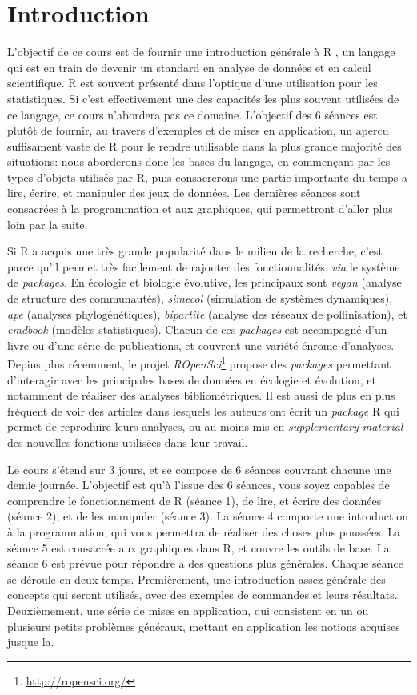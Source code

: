 \chapter{Introduction}

L'objectif de ce cours est de fournir une introduction générale à R \parencite{R-Development-Core-Team2008}, un langage qui est en train de devenir un standard en analyse de données et en calcul scientifique.
R est souvent présenté dans l'optique d'une utilisation pour les statistiques.
Si c'est effectivement une des capacités les plus souvent utilisées de ce langage, ce cours n'abordera pas ce domaine.
L'objectif des 6 séances est plutôt de fournir, au travers d'exemples et de mises en application, un apercu suffisament vaste de R pour le rendre utilisable dans la plus grande majorité des situations:
nous aborderons donc les bases du langage, en commençant par les types d'objets utilisés par R, puis consacrerons une partie importante du temps a lire, écrire, et manipuler des jeux de données.
Les dernières séances sont consacrées à la programmation et aux graphiques, qui permettront d'aller plus loin par la suite.

Si R a acquis une très grande popularité dans le milieu de la recherche, c'est parce qu'il permet très facilement de rajouter des fonctionnalités. \emph{via} le système de \emph{packages}.
En écologie et biologie évolutive, les principaux sont \emph{vegan} (analyse de structure des communautés), \emph{simecol} (simulation de systèmes dynamiques), \emph{ape} (analyses phylogénétiques), \emph{bipartite} (analyse des réseaux de pollinisation), et \emph{emdbook} (modèles statistiques).
Chacun de ces \emph{packages} est accompagné d'un livre ou d'une série de publications, et couvrent une variété énrome d'analyses.
Depius plus récemment, le projet \emph{ROpenSci}\footnote{\url{http://ropensci.org/}} propose des \emph{packages} permettant d'interagir avec les principales bases de données en écologie et évolution, et notamment de réaliser des analyses bibliométriques.
Il est aussi de plus en plus fréquent de voir des articles dans lesquels les auteurs ont écrit un \emph{package} R qui permet de reproduire leurs analyses, ou au moins mis en \emph{supplementary material} des nouvelles fonctions utilisées dans leur travail.  

Le cours s'étend sur 3 jours, et se compose de 6 séances couvrant chacune une demie journée.
L'objectif est qu'à l'issue des 6 séances, vous soyez capables de comprendre le fonctionnement de R (séance 1), de lire, et écrire des données (séance 2), et de les manipuler (séance 3).
La séance 4 comporte une introduction à la programmation, qui vous permettra de réaliser des choses plus poussées.
La séance 5 est consacrée aux graphiques dans R, et couvre les outils de base.
La séance 6 est prévue pour répondre a des questions plus générales.
Chaque séance se déroule en deux temps.
Premièrement, une introduction assez générale des concepts qui seront utilisés, avec des exemples de commandes et leurs résultats.
Deuxièmement, une série de mises en application, qui consistent en un ou plusieurs petits problèmes généraux, mettant en application les notions acquises jusque la. 

